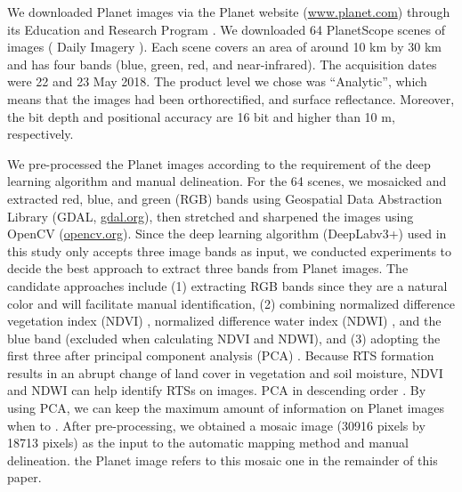 \documentclass[authoryear,preprint,review,12pt]{elsarticle}
\begin{document}
We downloaded Planet images via the Planet website (\url{www.planet.com}) through its Education and Research Program . We downloaded 64 PlanetScope scenes of images ( Daily Imagery ). Each scene covers an area of around 10 km by 30 km and has four bands (blue, green, red, and near-infrared). The acquisition dates were 22 and 23 May 2018. The product level we chose was ``Analytic'', which means that the images had been orthorectified, and  surface reflectance. Moreover, the bit depth and positional accuracy are 16 bit and higher than 10 m, respectively. %

We pre-processed the Planet images according to the requirement of the deep learning algorithm and manual delineation. For the 64 scenes, we mosaicked and extracted red, blue, and green (RGB) bands using Geospatial Data Abstraction Library (GDAL, \url{gdal.org}), then stretched and sharpened the images using OpenCV (\url{opencv.org}). Since the deep learning algorithm (DeepLabv3+) used in this study only accepts three image bands as input, we conducted experiments to decide the best approach to extract three bands from Planet images. The candidate approaches include (1) extracting RGB bands since they are a natural color and will facilitate manual identification, (2) combining normalized difference vegetation index (NDVI) \citep{rouse1974monitoring}, normalized difference water index (NDWI) \citep{mcfeeters1996use}, and the blue band (excluded when calculating NDVI and NDWI), and (3) adopting the first three  after  principal component analysis (PCA) . Because RTS formation results in an abrupt change of land cover in vegetation and soil moisture,  NDVI and NDWI can help identify RTSs on images. PCA  in descending order  \citep{wold1987principal}.  By using PCA, we can keep the maximum amount of information on Planet images when  to . 
 After pre-processing, we obtained a mosaic image (30916 pixels by 18713 pixels) as the input to the automatic mapping method and manual delineation.  the Planet image refers to this mosaic one in the remainder of this paper.
\end{document}
